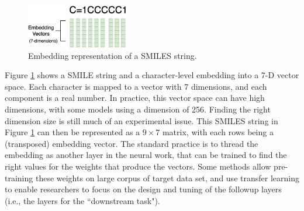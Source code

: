   \begin{figure}[htbp]
        \centering
        \includegraphics[width=0.4\textwidth]{figures/smileembedding.png}
        \caption{Embedding representation of a SMILES string.}
        \label{fig:smiles-to-embed}
    \end{figure}
Figure \ref{fig:smiles-to-embed} shows a SMILE string and a  character-level embedding into a 7-D vector space. Each character is mapped to a vector with 7 dimensions, and each component is a real number.  In practice, this vector space can have high dimensions, with some models using a dimension of 256. Finding the right dimension size is still much of an experimental issue. This SMILES  string in 
Figure \ref{fig:smiles-to-embed} can then be represented as  a $9 \times 7$ matrix, with each rows being a (transposed) embedding vector.
The standard practice is to thread the embedding as  another layer in the neural work, that can be trained to find the right values for the weights that produce the vectors. Some methods allow pre-training these weights on large corpus of target data set, and use transfer learning to enable researchers to focus on the design and tuning of the followup layers (i.e., the layers for the ``downstream task").

